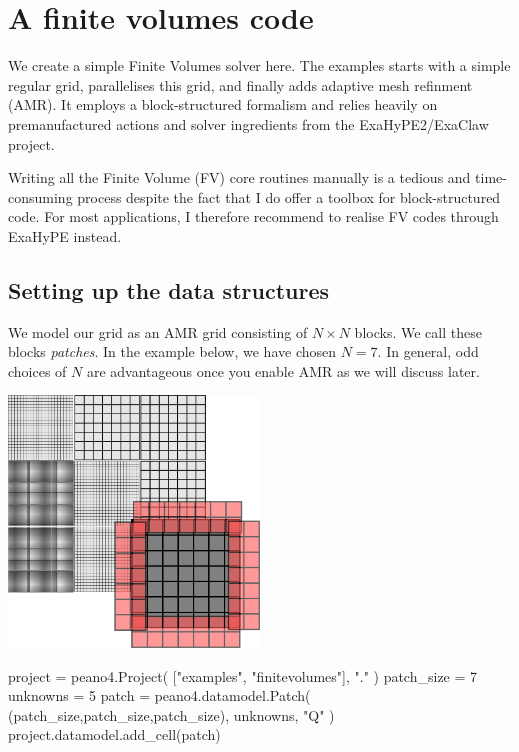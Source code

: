 \chapter{A finite volumes code}
\label{section:python-api-examples:finite-volumes}




We create a simple Finite Volumes solver here.
The examples starts with a simple regular grid, parallelises this grid, and
finally adds adaptive mesh refinment (AMR).
It employs a block-structured formalism and relies heavily on premanufactured
actions and solver ingredients from the ExaHyPE2/ExaClaw project.


\begin{remark}
Writing all the Finite Volume (FV) core routines manually is a tedious and
time-consuming process despite the fact that I do offer a toolbox for 
block-structured code.
For most applications, I therefore recommend to realise FV codes through ExaHyPE instead.
\end{remark}

\section{Setting up the data structures}

We model our grid as an AMR grid consisting of $N \times N$ blocks.
We call these blocks \emph{patches}.
In the example below, we have chosen $N=7$.
In general, odd choices of $N$ are advantageous once you enable AMR as we will
discuss later.

\begin{center}
  \includegraphics[width=0.5\textwidth]{42_finite-volumes/block-structured.pdf}
\end{center}

\begin{code}
project = peano4.Project( ["examples", "finitevolumes"], "." )
patch_size = 7
unknowns   = 5
patch = peano4.datamodel.Patch( (patch_size,patch_size,patch_size), unknowns, "Q" )
project.datamodel.add_cell(patch)
\end{code}

